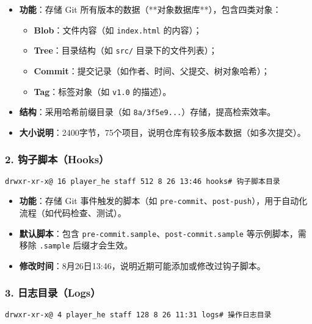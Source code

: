 \begin{itemize}[leftmargin=*, nosep]
    \item \textbf{功能}：存储 Git 所有版本的数据（**对象数据库**），包含四类对象：
    \begin{itemize}[leftmargin=*, nosep]
        \item \textbf{Blob}：文件内容（如 \texttt{index.html} 的内容）；
        \item \textbf{Tree}：目录结构（如 \texttt{src/} 目录下的文件列表）；
        \item \textbf{Commit}：提交记录（如作者、时间、父提交、树对象哈希）；
        \item \textbf{Tag}：标签对象（如 \texttt{v1.0} 的描述）。
    \end{itemize}
    \item \textbf{结构}：采用哈希前缀目录（如 \texttt{8a/3f5e9...}）存储，提高检索效率。
    \item \textbf{大小说明}：2400字节，75个项目，说明仓库有较多版本数据（如多次提交）。
\end{itemize}

\subsubsection{2. 钩子脚本（Hooks）}
\begin{verbatim}
drwxr-xr-x@ 16 player_he staff 512 8 26 13:46 hooks# 钩子脚本目录
\end{verbatim}

\begin{itemize}[leftmargin=*, nosep]
    \item \textbf{功能}：存储 Git 事件触发的脚本（如 \texttt{pre-commit}、\texttt{post-push}），用于自动化流程（如代码检查、测试）。
    \item \textbf{默认脚本}：包含 \texttt{pre-commit.sample}、\texttt{post-commit.sample} 等示例脚本，需移除 \texttt{.sample} 后缀才会生效。
    \item \textbf{修改时间}：8月26日13:46，说明近期可能添加或修改过钩子脚本。
\end{itemize}

\subsubsection{3. 日志目录（Logs）}
\begin{verbatim}
drwxr-xr-x@ 4 player_he staff 128 8 26 11:31 logs# 操作日志目录
\end{verbatim}

